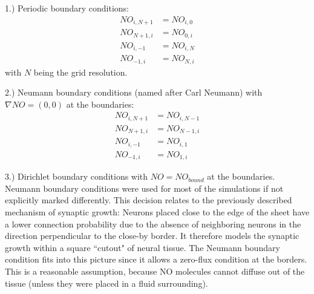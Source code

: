 \documentclass[10pt,a4paper]{article}
\begin{document}
1.) Periodic boundary conditions:
\begin{align}
NO_{i,N+1} &= NO_{i,0} \label{Periodic_Cond_1} \\
NO_{N+1,i} &= NO_{0,i} \label{Periodic_Cond_2} \\
NO_{i,-1} &= NO_{i,N} \label{Periodic_Cond_3} \\
NO_{-1,i} &= NO_{N,i} \label{Periodic_Cond_4}
\end{align}
with $N$ being the grid resolution.

2.) Neumann boundary conditions (named after Carl Neumann) with $\nabla NO = (0,0)$ at the boundaries:
\begin{align}
NO_{i,N+1} &= NO_{i,N-1} \label{Neumann_Cond_1} \\
NO_{N+1,i} &= NO_{N-1,i} \label{Neumann_Cond_2} \\
NO_{i,-1} &= NO_{i,1} \label{Neumann_Cond_3} \\
NO_{-1,i} &= NO_{1,i} \label{Neumann_Cond_4}
\end{align}

3.) Dirichlet boundary conditions with $NO = NO_{bound}$ at the boundaries.\\
Neumann boundary conditions were used for most of the simulations if not explicitly marked differently. This decision relates to the previously described mechanism of synaptic growth: Neurons placed close to the edge of the sheet have a lower connection probability due to the absence of neighboring neurons in the direction perpendicular to the close-by border. It therefore models the synaptic growth within a square ``cutout" of neural tissue. The Neumann boundary condition fits into this picture since it allows a zero-flux condition at the borders. This is a reasonable assumption, because NO molecules cannot diffuse out of the tissue (unless they were placed in a fluid surrounding).
\end{document}
